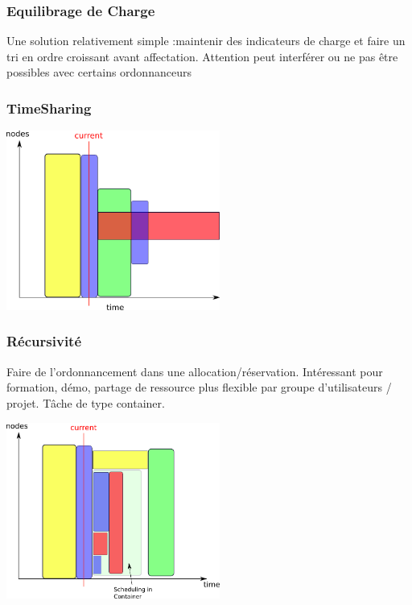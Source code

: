 \documentclass{beamer}
\begin{document}
\begin{frame}
  \frametitle{Equilibrage de Charge}

  Une solution relativement simple :maintenir des indicateurs de charge et faire un tri en ordre croissant avant affectation. Attention peut interférer ou ne pas être possibles avec certains ordonnanceurs 
\end{frame}

\begin{frame}
  \frametitle{TimeSharing}
  
  \begin{center}
			\includegraphics[width=7cm]{timesharing.png}
	\end{center}


\end{frame}

\begin{frame}
  \frametitle{Récursivité}
  Faire de l'ordonnancement dans une allocation/réservation. Intéressant pour formation, démo, partage de ressource plus flexible  par groupe d'utilisateurs / projet. Tâche de type container. 
  \begin{center}
			\includegraphics[width=7cm]{recursivity.png}
	\end{center}

\end{frame}
\end{document}
